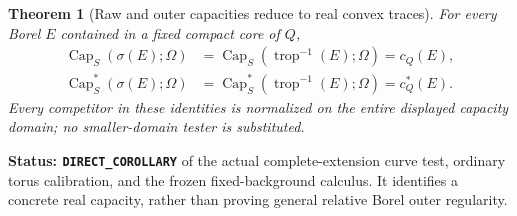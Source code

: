 \documentclass[11pt,a4paper]{article}
\numberwithin{equation}{section}
\newtheorem{theorem}{Theorem}[section]
\theoremstyle{definition}
\theoremstyle{remark}
\begin{document}
\begin{theorem}[Raw and outer capacities reduce to real convex traces]
\label{thm:r6-gauss-capacity-reduction}
For every Borel $E$ contained in a fixed compact core of $Q$,
\begin{align}
 \operatorname{Cap}_S(\sigma(E);\Omega)
 &=\operatorname{Cap}_S(\operatorname{trop}^{-1}(E);\Omega)
   =c_Q(E), \label{eq:r6-gauss-raw-reduction}\\
 \operatorname{Cap}_S^*(\sigma(E);\Omega)
 &=\operatorname{Cap}_S^*(\operatorname{trop}^{-1}(E);\Omega)
   =c_Q^*(E). \label{eq:r6-gauss-outer-reduction}
\end{align}
Every competitor in these identities is normalized on the entire
displayed capacity domain; no smaller-domain tester is substituted.
\end{theorem}

\noindent\textbf{Status: \texttt{DIRECT\_COROLLARY}} of the
actual complete-extension curve test, ordinary torus calibration, and
the frozen fixed-background calculus. It identifies a concrete real
capacity, rather than proving general relative Borel outer regularity.
\end{document}
